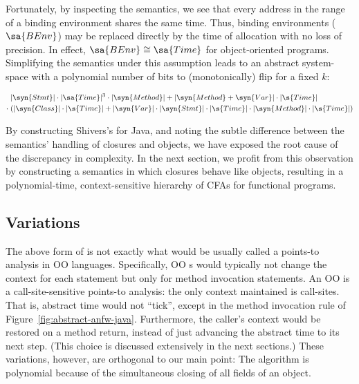 Fortunately, by inspecting the semantics, we see that every address
in the range of a binding environment shares the same time.
Thus, binding environments ($\sa{BEnv}$) may be replaced
directly by the time of allocation with no loss of precision.
In effect, $\sa{BEnv} \cong \sa{Time}$ for object-oriented programs.
Simplifying the semantics under this assumption leads to an abstract
system-space with a polynomial number of bits to (monotonically) flip for a fixed $k$:
\begin{small}\begin{align*}
    & |\syn{Stmt}| \cdot |\sa{Time}|^3 \cdot |\syn{Method}| 
    + |\syn{Method} + \syn{Var}| \cdot |\s{Time}| 
    \\
    \cdot\; & (|\syn{Class}| \cdot |\s{Time}| + |\syn{Var}| \cdot |\syn{Stmt}| \cdot |\s{Time}| \cdot |\syn{Method}| \cdot |\s{Time}|)    
\end{align*}\end{small}



By constructing Shivers's \kCFA{} for Java, and noting the subtle
difference between the semantics' handling of closures and objects, we
have exposed the root cause of the discrepancy in complexity.
In the next section, we profit from this observation by constructing a
semantics in which closures behave like objects, resulting in a
polynomial-time, context-sensitive hierarchy of CFAs for functional
programs.

\subsection{Variations}

The above form of \kCFA{} is not exactly what would be usually called
a \kCFA{} points-to analysis in OO languages. Specifically, OO
\kCFA{}s would typically not change the context for each statement but
only for method invocation statements. An OO \kCFA{} is a
call-site-sensitive points-to analysis: the only context maintained is
call-sites. That is, abstract time would not ``tick'', except in the
method invocation rule of
Figure~\ref{fig:abstract-anfw-java}. Furthermore, the caller's context
would be restored on a method return, instead of just advancing the
abstract time to its next step. (This choice is discussed extensively
in the next sections.) These variations, however, are orthogonal to
our main point: The algorithm is polynomial because of the
simultaneous closing of all fields of an object.




